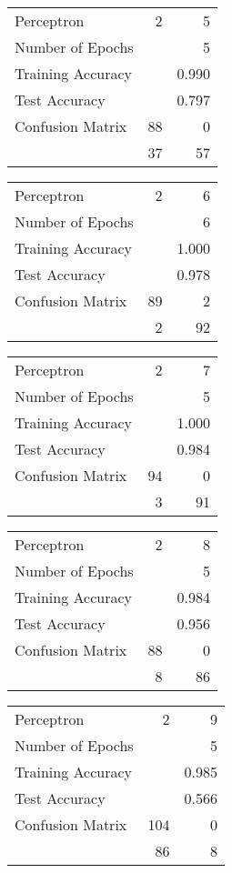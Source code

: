 \documentclass[11pt]{article}
\begin{document}
\begin{minipage}[t]{0.5\textwidth}
\begin{tabular}{|l | r r|}
\hline Perceptron & 2 & 5\\
Number of Epochs & & 5\\
Training Accuracy & & 0.990\\
Test Accuracy & & 0.797\\
Confusion Matrix & 88 & 0\\
 &37 & 57\\ \hline
\end{tabular}
\end{minipage}
\begin{minipage}[t]{0.5\textwidth}
\begin{tabular}{|l | r r|}
\hline Perceptron & 2 & 6\\
Number of Epochs & & 6\\
Training Accuracy & & 1.000\\
Test Accuracy & & 0.978\\
Confusion Matrix & 89 & 2\\
 &2 & 92\\ \hline
\end{tabular}
\end{minipage}
\begin{minipage}[t]{0.5\textwidth}
\begin{tabular}{|l | r r|}
\hline Perceptron & 2 & 7\\
Number of Epochs & & 5\\
Training Accuracy & & 1.000\\
Test Accuracy & & 0.984\\
Confusion Matrix & 94 & 0\\
 &3 & 91\\ \hline
\end{tabular}
\end{minipage}
\begin{minipage}[t]{0.5\textwidth}
\begin{tabular}{|l | r r|}
\hline Perceptron & 2 & 8\\
Number of Epochs & & 5\\
Training Accuracy & & 0.984\\
Test Accuracy & & 0.956\\
Confusion Matrix & 88 & 0\\
 &8 & 86\\ \hline
\end{tabular}
\end{minipage}
\begin{minipage}[t]{0.5\textwidth}
\begin{tabular}{|l | r r|}
\hline Perceptron & 2 & 9\\
Number of Epochs & & 5\\
Training Accuracy & & 0.985\\
Test Accuracy & & 0.566\\
Confusion Matrix & 104 & 0\\
 &86 & 8\\ \hline
\end{tabular}
\end{minipage}
\end{document}
